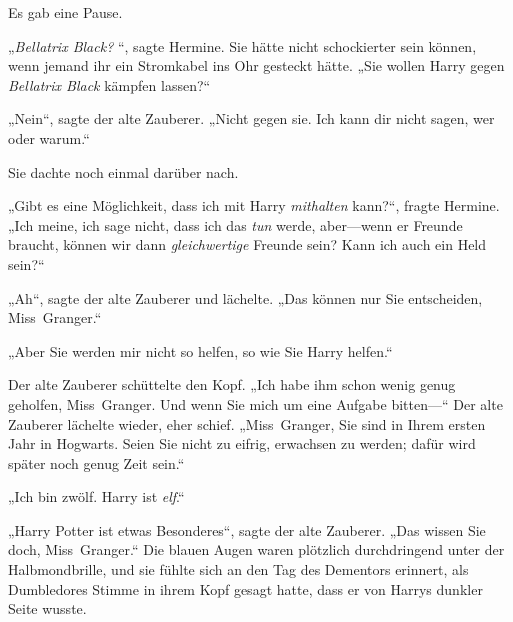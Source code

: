 Es gab eine Pause.

„\emph{Bellatrix Black? }“, sagte Hermine. Sie hätte nicht schockierter sein können, wenn jemand ihr ein Stromkabel ins Ohr gesteckt hätte. „Sie wollen Harry gegen \emph{Bellatrix Black} kämpfen lassen?“

„Nein“, sagte der alte Zauberer. „Nicht gegen sie. Ich kann dir nicht sagen, wer oder warum.“

Sie dachte noch einmal darüber nach.

„Gibt es eine Möglichkeit, dass ich mit Harry \emph{mithalten} kann?“, fragte Hermine. „Ich meine, ich sage nicht, dass ich das \emph{tun} werde, aber—wenn er Freunde braucht, können wir dann \emph{gleichwertige} Freunde sein? Kann ich auch ein Held sein?“

„Ah“, sagte der alte Zauberer und lächelte. „Das können nur Sie entscheiden, Miss~Granger.“

„Aber Sie werden mir nicht so helfen, so wie Sie Harry helfen.“

Der alte Zauberer schüttelte den Kopf. „Ich habe ihm schon wenig genug geholfen, Miss~Granger. Und wenn Sie mich um eine Aufgabe bitten—“ Der alte Zauberer lächelte wieder, eher schief. „Miss~Granger, Sie sind in Ihrem ersten Jahr in Hogwarts. Seien Sie nicht zu eifrig, erwachsen zu werden; dafür wird später noch genug Zeit sein.“

„Ich bin zwölf. Harry ist \emph{elf}.“

„Harry Potter ist etwas Besonderes“, sagte der alte Zauberer. „Das wissen Sie doch, Miss~Granger.“ Die blauen Augen waren plötzlich durchdringend unter der Halbmondbrille, und sie fühlte sich an den Tag des Dementors erinnert, als Dumbledores Stimme in ihrem Kopf gesagt hatte, dass er von Harrys dunkler Seite wusste.

